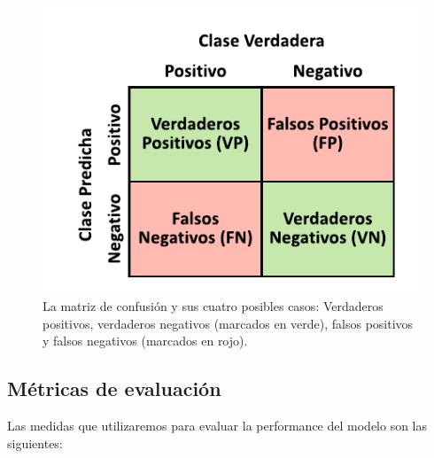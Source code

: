 \begin{figure}[H]
    \centering
    \includegraphics[scale=1]{documents/latex/figures/1/confusion_matrix.pdf}
    \caption{La matriz de confusión y sus cuatro posibles casos: Verdaderos positivos, verdaderos negativos (marcados en verde), falsos positivos y falsos negativos (marcados en rojo).}
    \label{fig:confusion_matrix}
\end{figure}



\subsection{Métricas de evaluación} \label{eval_metrics}

Las medidas que utilizaremos para evaluar la performance del modelo son las siguientes:

